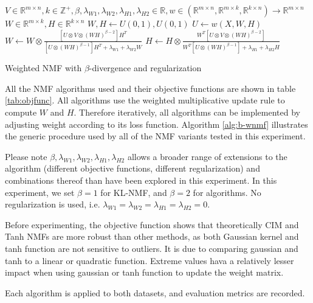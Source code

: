 \documentclass{article} %
\begin{document}
\begin{algorithm}
\begin{algorithmic}
\REQUIRE $V \in \mathbb{R}^{m \times n}, k \in \mathbb{Z}^+, \beta,\lambda_{W1},\lambda_{W2},\lambda_{H1},\lambda_{H2} \in \mathbb{R},w \in \left(\mathbb{R}^{m \times n}, \mathbb{R}^{m \times k}, \mathbb{R}^{k \times n}\right) \to \mathbb{R}^{m \times n}$
\ENSURE $W \in \mathbb{R}^{m \times k}, H \in \mathbb{R}^{k \times n}$
\STATE $W,H \gets U\left(0,1\right),U\left(0,1\right)$
\REPEAT
  \STATE $U \gets w\left(X,W,H\right)$
  \STATE $W \gets W \otimes \frac{\left[U \otimes V \otimes \left(WH\right)^{\beta-2}\right] H^T}{\left[U \otimes \left(WH\right)^{\beta-1}\right]H^T + \lambda_{W1} + \lambda_{W2} W}$
  \STATE $H \gets H \otimes \frac{W^T \left[U \otimes V \otimes \left(WH\right)^{\beta-2}\right]}{W^T \left[U \otimes \left(WH\right)^{\beta-1}\right] + \lambda_{H1} + \lambda_{H2} H}$
\end{algorithmic}
\caption{Weighted NMF with $\beta$-divergence and regularization\label{alg:b-wnmf}}
\end{algorithm}

All the NMF algorithms used and their objective functions are shown in table \ref{tab:objfunc}. All algorithms use the weighted multiplicative update rule to compute $W$ and $H$. Therefore iteratively, all algorithms can be implemented by adjusting weight according to its loss function. \cite{arora} Algorithm \ref{alg:b-wnmf} illustrates the generic procedure used by all of the NMF variants tested in this experiment.

Please note $\beta,\lambda_{W1},\lambda_{W2},\lambda_{H1},\lambda_{H2}$ allows a broader range of extensions to the algorithm (different objective functions, different regularization) and combinations thereof than have been explored in this experiment. In this experiment, we set $\beta=1$ for KL-NMF, and $\beta=2$ for algorithms. No regularization is used, i.e. $\lambda_{W1}=\lambda_{W2}=\lambda_{H1}=\lambda_{H2}=0$.

Before experimenting, the objective function shows that theoretically CIM and Tanh NMFs are more robust than other methods, as both Gaussian kernel and tanh function are not sensitive to outliers. It is due to comparing gaussian and tanh to a linear or quadratic function. Extreme values hava a relatively lesser impact when using gaussian or tanh function to update the weight matrix.

Each algorithm is applied to both datasets, and evaluation metrics are recorded.
\end{document}
